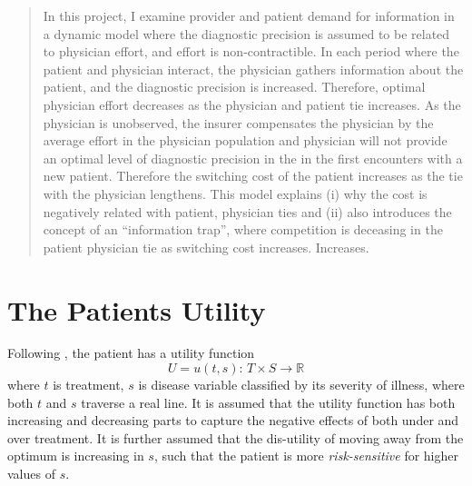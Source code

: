 \documentclass[10pt,a4paper]{article} 					%
\begin{document}
\maketitle


\begin{abstract}
In this project, I examine provider and patient demand for information in a dynamic model where the diagnostic precision is assumed to be related to physician effort, and effort is non-contractible. In each period where the patient and physician interact, the physician gathers information about the patient, and the diagnostic precision is increased. Therefore, optimal physician effort decreases as the physician and patient tie increases. As the physician is unobserved, the insurer compensates the physician by the average effort in the physician population and physician will not provide an optimal level of diagnostic precision in the in the first encounters with a new patient. Therefore the switching cost of the patient increases as the tie with the physician lengthens. This model explains (i) why the cost is negatively related with patient, physician ties and (ii) also introduces the concept of an ``information trap'', where competition is deceasing in the patient physician tie as switching cost increases. Increases.
\end{abstract}


\section{The Patients Utility}

Following \citet{Rochaix1989}, the patient has a utility function
\[
	U = u(t,s):\, T\times S\rightarrow\mathbb{R}
\]
where $t$ is treatment, $s$ is disease variable classified by its severity of illness, where both $t$ and $s$ traverse a real line. It is assumed that the utility function has both increasing and decreasing parts to capture the negative effects of both under and over treatment. It is further assumed that the dis-utility of moving away from the optimum is increasing in $s$, such that the patient is more \emph{risk-sensitive} for higher values of $s$.
\end{document}
